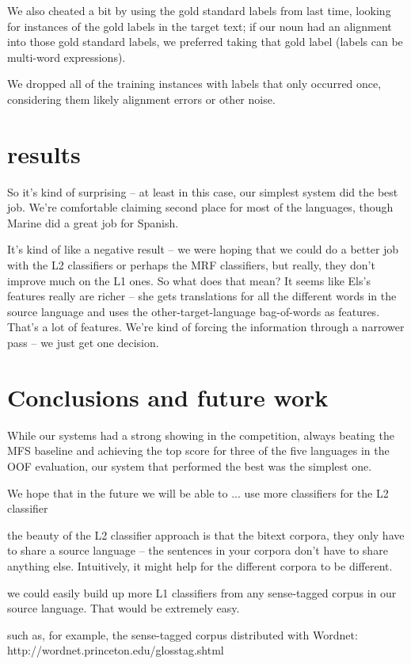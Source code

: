 \documentclass[11pt,letterpaper]{article}
\begin{document}
We also cheated a bit by using the gold standard labels from last time, looking
for instances of the gold labels in the target text; if our noun had an
alignment into those gold standard labels, we preferred taking that gold label
(labels can be multi-word expressions).


We dropped all of the training instances with labels that only occurred once,
considering them likely alignment errors or other noise.


\section{results}
So it's kind of surprising -- at least in this case, our simplest system did
the best job. We're comfortable claiming second place for most of the
languages, though Marine did a great job for Spanish.


It's kind of like a negative result -- we were hoping that we could do a better
job with the L2 classifiers or perhaps the MRF classifiers, but really, they
don't improve much on the L1 ones.
So what does that mean?
It seems like Els's features really are richer -- she gets translations for all
the different words in the source language and uses the other-target-language
bag-of-words as features. That's a lot of features. We're kind of forcing the
information through a narrower pass -- we just get one decision.


\section{Conclusions and future work}


While our systems had a strong showing in the competition, always beating the
MFS baseline and achieving the top score for three of the five languages in the
OOF evaluation, our system that performed the best was the simplest one.


We hope that in the future we will be able to ...
 use more classifiers for the L2 classifier

 the beauty of the L2 classifier approach is that the bitext corpora, they
only have to share a source language -- the sentences in your corpora don't
have to share anything else. Intuitively, it might help for the different
corpora to be different.

 we could easily build up more L1 classifiers from any sense-tagged corpus in
our source language. That would be extremely easy.

such as, for example, the sense-tagged corpus distributed with Wordnet:
http://wordnet.princeton.edu/glosstag.shtml
\end{document}
